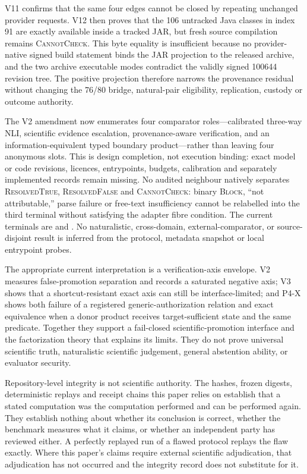 V11 confirms that the same four edges cannot be closed by repeating unchanged
provider requests.  V12 then proves that the 106 untracked Java classes in
index 91 are exactly available inside a tracked JAR, but fresh source
compilation remains \textsc{CannotCheck}.  This byte equality is insufficient
because no provider-native signed build statement binds the JAR projection to
the released archive, and the two archive executable modes contradict the
validly signed 100644 revision tree.  The positive projection therefore
narrows the provenance residual without changing the 76/80 bridge, natural-pair
eligibility, replication, custody or outcome authority.

The V2 amendment now enumerates four comparator roles---calibrated three-way
NLI, scientific evidence escalation, provenance-aware verification, and an
information-equivalent typed boundary product---rather than leaving four
anonymous slots.  This is design completion, not execution binding: exact model
or code revisions, licences, entrypoints, budgets, calibration and separately
implemented records remain missing. No audited neighbour natively separates \textsc{ResolvedTrue},
\textsc{ResolvedFalse} and \textsc{CannotCheck}: binary \textsc{Block}, ``not
attributable,'' parse failure or free-text insufficiency cannot be relabelled
into the third terminal without satisfying the adapter fibre condition. The
current terminals are
 and
. No naturalistic, cross-domain,
external-comparator, or source-disjoint result is inferred from the protocol,
metadata snapshot or local entrypoint probes.

The appropriate current interpretation is a verification-axis envelope.  V2
measures false-promotion separation and records a saturated negative axis; V3
shows that a shortcut-resistant exact axis can still be interface-limited; and
P4-X shows both failure of a registered generic-authorization relation and exact
equivalence when a donor product receives target-sufficient state and the same
predicate.  Together they support a fail-closed scientific-promotion interface
and the factorization theory that explains its limits.  They do not prove
universal scientific truth, naturalistic scientific judgement, general
abstention ability, or evaluator security.

Repository-level integrity is not scientific authority. The hashes, frozen
digests, deterministic replays and receipt chains this paper relies on establish
that a stated computation was the computation performed and can be performed
again. They establish nothing about whether its conclusion is correct, whether
the benchmark measures what it claims, or whether an independent party has
reviewed either. A perfectly replayed run of a flawed protocol replays the flaw
exactly. Where this paper's claims require external scientific adjudication,
that adjudication has not occurred and the integrity record does not substitute
for it.
